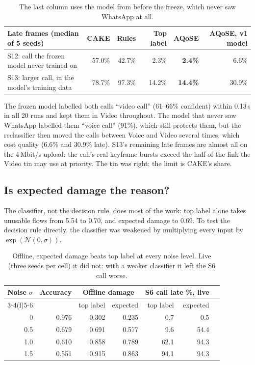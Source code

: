 \documentclass[11pt,a4paper]{article}
\newcommand{\ours}[1]{\textbf{\color{aq}#1}}
\begin{document}
\begin{table}[H]\centering\small
\begin{tabular}{@{}lrrrrr@{}}
\toprule
Late frames (median of 5 seeds) & CAKE & Rules & Top label & \textbf{AQoSE} & AQoSE, v1 model \\
\midrule
S12: call the frozen model never trained on & 57.0\% & 42.7\% & 2.3\% & \ours{2.4\%} & 6.6\% \\
S13: larger call, in the model's training data & 78.7\% & 97.3\% & 14.2\% & \ours{14.4\%} & 30.9\% \\
\bottomrule
\end{tabular}
\caption{The last column uses the model from before the freeze, which never saw WhatsApp at all.}
\end{table}

The frozen model labelled both calls ``video call'' (61--66\% confident) within 0.13\,s in all 20 runs and kept them in Video throughout. The model that never saw WhatsApp labelled them ``voice call'' (91\%), which still protects them, but the reclassifier then moved the calls between Voice and Video several times, which cost quality (6.6\% and 30.9\% late). S13's remaining late frames are almost all on the 4\,Mbit/s upload: the call's real keyframe bursts exceed the half of the link the Video tin may use at priority. The tin was right; the limit is CAKE's share.

\subsection{Is expected damage the reason?}\label{sec:ablation}
The classifier, not the decision rule, does most of the work: top label alone takes unusable flows from 5.54 to 0.70, and expected damage to 0.69. To test the decision rule directly, the classifier was weakened by multiplying every input by $\exp(\mathcal{N}(0,\sigma))$.

\begin{table}[H]\centering\small
\begin{tabular}{@{}rrrrrrr@{}}
\toprule
Noise $\sigma$ & Accuracy & \multicolumn{2}{c}{Offline damage} & \multicolumn{2}{c}{S6 call late \%, live} \\
\cmidrule(lr){3-4}\cmidrule(l){5-6}
 & & top label & expected & top label & expected \\
\midrule
0 & 0.976 & 0.302 & 0.235 & 0.7 & 0.5 \\
0.5 & 0.679 & 0.691 & 0.577 & 9.6 & 54.4 \\
1.0 & 0.610 & 0.858 & 0.789 & 62.1 & 94.3 \\
1.5 & 0.551 & 0.915 & 0.863 & 94.1 & 94.3 \\
\bottomrule
\end{tabular}
\caption{Offline, expected damage beats top label at every noise level. Live (three seeds per cell) it did not: with a weaker classifier it left the S6 call worse.}
\end{table}
\end{document}
